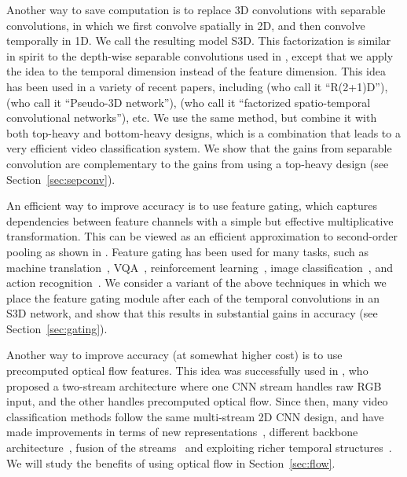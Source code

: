 \documentclass[runningheads]{llncs}
\begin{document}
Another way to save computation is to replace 3D convolutions with separable convolutions, in which we first convolve spatially in 2D, and then convolve temporally in 1D.
We call the resulting model S3D.
This factorization is similar in spirit to the depth-wise separable convolutions
 used in \cite{xception,mobilenet,resnext}, except that we apply the idea
 to the temporal dimension instead of the feature dimension.
This idea has been used in a variety of recent papers,
including \cite{Tran2018} (who call it ``R(2+1)D''),
\cite{P3D} (who call it ``Pseudo-3D network''),
\cite{Sun2015} (who call it ``factorized spatio-temporal convolutional networks''),
etc.
We use the same method, but combine it with both top-heavy and bottom-heavy designs, which is a combination that leads to a very efficient video classification system.
We show that the gains from separable convolution are complementary to the gains from using a top-heavy design (see Section~\ref{sec:sepconv}).


An efficient way to improve accuracy is to use feature gating, which captures dependencies between feature channels with a simple but effective multiplicative transformation.
This can be viewed as an efficient approximation to second-order pooling
as shown in \cite{Girdhar_17b_AttentionalPoolingAction}.
Feature gating has been used for many tasks, 
such as machine translation~\cite{dauphin2016language}, 
VQA~\cite{perez2017film}, 
reinforcement learning~\cite{elfwing2018sigmoid}, image classification~\cite{ramachandran2017swish,hu2017squeeze},
and action recognition~\cite{miech2017learnable}.
We consider a variant of the above techniques in 
which we place the feature gating module after each of the temporal convolutions in an S3D network,
and show that this results in substantial gains in accuracy (see Section~\ref{sec:gating}).


Another way to improve accuracy (at somewhat higher cost)
is to use precomputed optical flow features.
This idea was successfully used in \cite{TwoStreamVGG},
who proposed a two-stream architecture where one CNN stream handles raw RGB input,  and the other
 handles  precomputed optical flow. 
Since then, many video classification methods follow the same multi-stream 2D CNN design, and have made improvements in terms of new representations~\cite{bilen2016dynamic,bilen2017action}, different backbone architecture~\cite{FeichtenhoferCVPR17,TwoStreamCUHK,ng_cvpr15,Girdhar_17b_AttentionalPoolingAction}, fusion of the streams~\cite{Feichtenhofer16,feichtenhofer2017,FeichtenhoferNIPS16,chained_fusion} and exploiting richer temporal structures~\cite{lrcn2014,Wang_Transformation,tsn_wang_eccv16}.
We will study the benefits of using optical flow in Section~\ref{sec:flow}.
 
\end{document}

